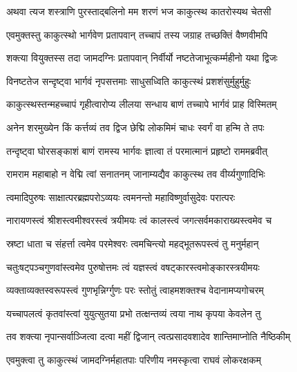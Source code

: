 \twolineshloka
{अथवा त्यज शस्त्राणि पुरस्ताद्बलिनो मम}
{शरणं भज काकुत्स्थ कातरोस्यथ चेतसी}%


\twolineshloka
{एवमुक्तस्तु काकुत्स्थो भार्गवेण प्रतापवान्}
{तच्चापं तस्य जग्राह तच्छक्तिं वैष्णवीमपि}%

\twolineshloka
{शक्त्या वियुक्तस्स तदा जामदग्निः प्रतापवान्}
{निर्वीर्यो नष्टतेजाभूत्कर्म्महीनो यथा द्विजः}%

\twolineshloka
{विनष्टतेज सन्दृष्ट्वा भार्गवं नृपसत्तमाः}
{साधुसध्विति काकुत्स्थं प्रशशंसुर्मुहुर्मुहुः}%

\twolineshloka
{काकुत्स्थस्तन्महच्चापं गृहीत्वारोप्य लीलया}
{सन्धाय बाणं तच्चापे भार्गवं प्राह विस्मितम्}%


\twolineshloka
{अनेन शरमुख्येन किं कर्त्तव्यं तव द्विज}
{छेद्मि लोकमिमं चाधः स्वर्गं वा हन्मि ते तपः}%


\twolineshloka
{तन्दृष्ट्वा घोरसङ्काशं बाणं रामस्य भार्गवः}
{ज्ञात्वा तं परमात्मानं प्रहृष्टो राममब्रवीत्}%


\twolineshloka
{रामराम महाबाहो न वेद्मि त्वां सनातनम्}
{जानाम्यद्यैव काकुत्स्थ तव वीर्य्यगुणादिभिः}%

\twolineshloka
{त्वमादिपुरुषः साक्षात्परब्रह्मपरोऽव्ययः}
{त्वमनन्तो महाविष्णुर्वासुदेवः परात्परः}%

\twolineshloka
{नारायणस्त्वं श्रीशस्त्वमीश्वरस्त्वं त्रयीमयः}
{त्वं कालस्त्वं जगत्सर्वमकाराख्यस्त्वमेव च}%

\twolineshloka
{स्रष्टा धाता च संहर्त्ता त्वमेव परमेश्वरः}
{त्वमचिन्त्यो महद्भूतरूपस्त्वं तु मनुर्महान्}%

\twolineshloka
{चतुःषट्पञ्चगुणवांस्त्वमेव पुरुषोत्तमः}
{त्वं यज्ञस्त्वं वषट्कारस्त्वमोङ्कारस्त्रयीमयः}%

\twolineshloka
{व्यक्ताव्यक्तस्वरूपस्त्वं गुणभृन्निर्ग्गुणः परः}
{स्तोतुं त्वाहमशक्तश्च वेदानामप्यगोचरम्}%

\twolineshloka
{यच्चापलत्वं कृतवांस्त्वां युयुत्सुतया प्रभो}
{तत्क्षन्तव्यं त्वया नाथ कृपया केवलेन तु}%

\twolineshloka
{तव शक्त्या नृपान्सर्वाञ्जित्वा दत्वा महीं द्विजान्}
{त्वत्प्रसादवशादेव शान्तिमाप्नोति नैष्ठिकीम्}%


\twolineshloka
{एवमुक्त्वा तु काकुत्स्थं जामदग्निर्महातपाः}
{परिणीय नमस्कृत्वा राघवं लोकरक्षकम्}%

